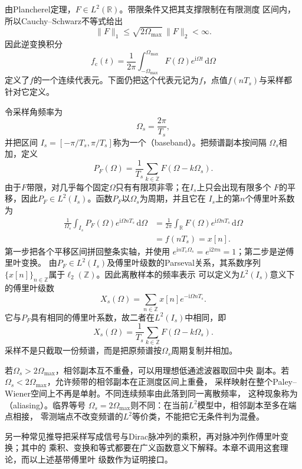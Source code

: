 由Plancherel定理，$F\in L^2(\mathbb{R})$。带限条件又把其支撑限制在有限测度
区间内，所以Cauchy--Schwarz不等式给出
\[
  \lVert F\rVert_1
  \leq
  \sqrt{2\Omega_{\max}}\,\lVert F\rVert_2
  <\infty.
\]
因此逆变换积分
\[
  f_{\mathrm{c}}(t)
  =
  \frac{1}{2\pi}\int_{-\Omega_{\max}}^{\Omega_{\max}}
  F(\Omega)e^{\mathrm{i}\Omega t}\,\mathrm{d}\Omega
\]
定义了$f$的一个连续代表元。下面仍把这个代表元记为$f$，点值$f(nT_s)$与采样都
针对它定义。

令采样角频率为
\[
  \Omega_s=\frac{2\pi}{T_s},
\]
并把区间
$I_s=[-\pi/T_s,\pi/T_s]$称为一个（baseband）。把频谱副本按间隔
$\Omega_s$相加，定义
\[
  P_F(\Omega)
  =
  \frac{1}{T_s}
  \sum_{k\in\mathbb{Z}}F(\Omega-k\Omega_s).
\]
由于$F$带限，对几乎每个固定$\Omega$只有有限项非零；在$I_s$上只会出现有限多个
$F$的平移，因此$P_F\in L^2(I_s)$。函数$P_F$以$\Omega_s$为周期，并且它在
$I_s$上的第$n$个傅里叶系数为
\begin{align*}
  \frac{1}{\Omega_s}
  \int_{I_s}
  P_F(\Omega)e^{\mathrm{i}\Omega nT_s}\,\mathrm{d}\Omega
  &=
  \frac{1}{2\pi}
  \int_{\mathbb{R}}
  F(\Omega)e^{\mathrm{i}\Omega nT_s}\,\mathrm{d}\Omega\\
  &=
  f(nT_s)
  =
  x[n].
\end{align*}
第一步把各个平移区间拼回整条实轴，并使用
$e^{\mathrm{i}nT_s\Omega_s}=e^{\mathrm{i}2\pi n}=1$；第二步是逆傅里叶变换。
由$P_F\in L^2(I_s)$及傅里叶级数的Parseval关系，其系数序列
$\{x[n]\}_{n\in\mathbb{Z}}$属于$\ell_2(\mathbb{Z})$。因此离散样本的频率表示
可以定义为$L^2(I_s)$意义下的傅里叶级数
\[
  X_s(\Omega)
  =
  \sum_{n\in\mathbb{Z}}
  x[n]e^{-\mathrm{i}\Omega nT_s}.
\]
它与$P_F$具有相同的傅里叶系数，故二者在$L^2(I_s)$中相同，即
\begin{equation}
  X_s(\Omega)
  =
  \frac{1}{T_s}
  \sum_{k\in\mathbb{Z}}F(\Omega-k\Omega_s).
  \label{eq:signal-analysis-spectral-replication}
\end{equation}
采样不是只截取一份频谱，而是把原频谱按$\Omega_s$周期复制并相加。

若$\Omega_s>2\Omega_{\max}$，相邻副本互不重叠，可以用理想低通滤波器取回中央
副本。若$\Omega_s<2\Omega_{\max}$，允许频带的相邻副本在正测度区间上重叠，
采样映射在整个Paley--Wiener空间上不再是单射。不同连续频率由此落到同一离散频率，
这种现象称为（aliasing）。临界等号
$\Omega_s=2\Omega_{\max}$则不同：在当前$L^2$模型中，相邻副本至多在端点相接，
零测端点不改变频谱的$L^2$等价类，不能把它无条件判为混叠。

另一种常见推导把采样写成信号与Dirac脉冲列的乘积，再对脉冲列作傅里叶变换；其中的
乘积、变换和等式都要在广义函数意义下解释。本章不调用这套理论，而以上述基带傅里叶
级数作为证明接口。


